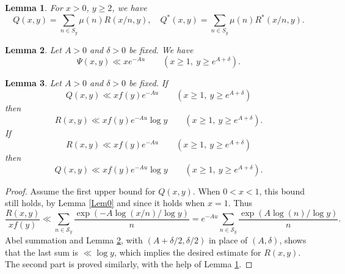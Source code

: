 \documentclass[10pt,a4paper]{amsart}
\newtheorem{lemma}{Lemma}
\begin{document}
\begin{lemma}\label{LemMobInv}
For $x> 0$, $y\ge 2$, we have
\begin{equation*}
Q(x,y)= \sum_{n\in S_y} \mu(n) R(x/n,y), \quad Q^*(x,y)= \sum_{n\in S_y} \mu(n) R^*(x/n,y).
\end{equation*}
\end{lemma}

\begin{lemma}\label{PsiLem}
Let $A>0$ and $\delta>0$ be fixed. We have
$$
\Psi(x,y) \ll x e^{-Au} \qquad (x\ge 1, \ y\ge e^{A+\delta}).
$$
\end{lemma}

\begin{lemma}\label{LemRQ}
Let $A>0$ and $\delta>0$ be fixed. If
$$
Q(x,y) \ll x f(y) e^{-A u} \qquad (x\ge 1,\  y\ge e^{A+\delta})
$$
then
$$
R(x,y)  \ll x f(y) e^{-A u}  \log y \qquad (x\ge 1,\  y\ge e^{A+\delta}).
$$
 If
$$
R(x,y) \ll x f(y) e^{-A u} \qquad (x\ge 1,\  y\ge e^{A+\delta})
$$
then
$$
Q(x,y)  \ll x f(y) e^{-A u}  \log y \qquad (x\ge 1,\  y\ge e^{A+\delta}).
$$
\end{lemma}

\begin{proof}
Assume the first upper bound for $Q(x,y)$. When $0<x<1$, this bound still holds, 
by Lemma \ref{Lem0} and since it holds when $x=1$. Thus 
$$
\frac{R(x,y)}{x f(y)} \ll \sum_{n\in \mathcal{S}_y} \frac{ \exp(-A\log(x/n)/\log y)}{n}
= e^{-Au} \sum_{n\in \mathcal{S}_y} \frac{\exp(A\log(n)/\log y)}{n }.
$$
Abel summation and Lemma \ref{PsiLem}, with $(A+\delta/2,\delta/2)$ in place of $(A,\delta)$, 
shows that the last sum is $\ll \log y$, which implies the desired estimate for $R(x,y)$. 
The second part is proved similarly, with the help of Lemma \ref{LemMobInv}.
\end{proof}
\end{document}
